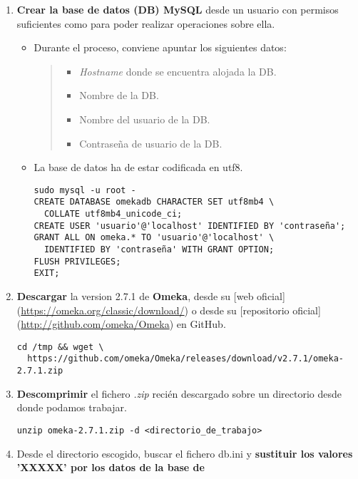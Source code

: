 \begin{enumerate}
\def\labelenumi{\arabic{enumi}.}
\tightlist
\item
  \textbf{Crear la base de datos (DB) MySQL} desde un usuario con
  permisos suficientes como para poder realizar operaciones sobre ella.

  \begin{itemize}
  \item
    Durante el proceso, conviene apuntar los siguientes datos:

    \begin{quote}
    \begin{itemize}
    \tightlist
    \item
      \emph{Hostname} donde se encuentra alojada la DB.
    \item
      Nombre de la DB.
    \item
      Nombre del usuario de la DB.
    \item
      Contraseña de usuario de la DB.
    \end{itemize}
    \end{quote}
  \item
    La base de datos ha de estar codificada en {utf8}.
\begin{verbatim}
sudo mysql -u root -
CREATE DATABASE omekadb CHARACTER SET utf8mb4 \
  COLLATE utf8mb4_unicode_ci;
CREATE USER 'usuario'@'localhost' IDENTIFIED BY 'contraseña';
GRANT ALL ON omeka.* TO 'usuario'@'localhost' \
  IDENTIFIED BY 'contraseña' WITH GRANT OPTION;
FLUSH PRIVILEGES;
EXIT;
\end{verbatim}
\end{itemize}
\item
  \textbf{Descargar} la version 2.7.1 de \textbf{Omeka}, desde su {[}web
  oficial{]}(\url{https://omeka.org/classic/download/}) o desde su
  {[}repositorio oficial{]}(\url{http://github.com/omeka/Omeka}) en
  GitHub.
\begin{verbatim}
cd /tmp && wget \
  https://github.com/omeka/Omeka/releases/download/v2.7.1/omeka-2.7.1.zip
\end{verbatim}
\item
  \textbf{Descomprimir} el fichero \emph{.zip} recién descargado sobre un
  directorio desde donde podamos trabajar.  
\begin{verbatim}
unzip omeka-2.7.1.zip -d <directorio_de_trabajo>
\end{verbatim}
\item
  Desde el directorio escogido, buscar el fichero {db.ini} y
  \textbf{sustituir los valores 'XXXXX' por los datos de la base de
}
\end{enumerate}
